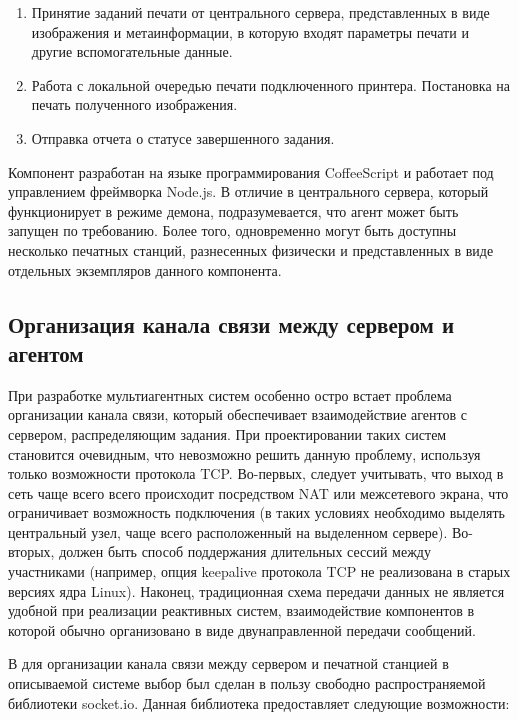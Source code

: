 \documentclass[a4paper,14pt,href,draft]{article}
\begin{document}
\begin{enumerate}
  \item Принятие заданий печати от центрального сервера, представленных в виде изображения и метаинформации, в которую
  входят параметры печати и другие вспомогательные данные.

  \item Работа с локальной очередью печати подключенного принтера. Постановка на печать полученного изображения.

  \item Отправка отчета о статусе завершенного задания.
\end{enumerate}

Компонент разработан на языке программирования CoffeeScript и работает под управлением фреймворка Node.js. В отличие в
центрального сервера, который функционирует в режиме демона, подразумевается, что агент может быть запущен по требованию.
Более того, одновременно могут быть доступны несколько печатных станций, разнесенных физически и представленных в виде
отдельных экземпляров данного компонента.

\subsection{Организация канала связи между сервером и агентом}
При разработке мультиагентных систем особенно остро встает проблема организации канала связи, который обеспечивает
взаимодействие агентов с сервером, распределяющим задания. При проектировании таких систем становится очевидным, что
невозможно решить данную проблему, используя только возможности протокола TCP. Во-первых, следует учитывать, что
выход в сеть чаще всего всего происходит посредством NAT или межсетевого экрана, что ограничивает возможность
подключения (в таких условиях необходимо выделять центральный узел, чаще всего расположенный на выделенном сервере).
Во-вторых, должен быть способ поддержания длительных сессий между участниками (например, опция keepalive\cite{Keepalive}
протокола TCP не реализована в старых версиях ядра Linux). Наконец, традиционная схема передачи данных не является
удобной при реализации реактивных систем, взаимодействие компонентов в которой обычно организовано в виде двунаправленной
передачи сообщений.

В для организации канала связи между сервером и печатной станцией в описываемой системе выбор был сделан в пользу
свободно распространяемой библиотеки socket.io\cite{SocketIO}. Данная библиотека предоставляет следующие возможности:
\end{document}
